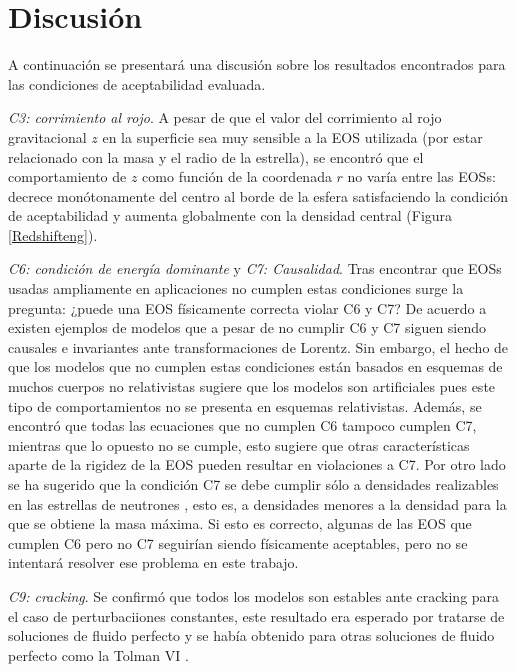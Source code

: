\section{Discusión}

\noindent A continuación se presentará una discusión sobre los resultados encontrados para las condiciones de aceptabilidad evaluada.

\emph{C3: corrimiento al rojo}. A pesar de que el valor del corrimiento al rojo gravitacional $z$ en la superficie sea muy sensible a la EOS utilizada (por estar relacionado con la masa y el radio de la estrella), se encontró que el comportamiento de $z$ como función de la coordenada $r$ no varía entre las EOSs: decrece monótonamente del centro al borde de la esfera satisfaciendo la condición de aceptabilidad y aumenta globalmente con la densidad central (Figura \ref{Redshifteng}).

\emph{C6: condición de energía dominante} y \emph{C7: Causalidad}. Tras encontrar que EOSs usadas ampliamente en aplicaciones no cumplen estas condiciones surge la pregunta: ¿puede una EOS físicamente correcta violar C6 y C7? De acuerdo a \cite{Haensel2007} existen ejemplos de modelos que a pesar de no cumplir C6 y C7 siguen siendo causales e invariantes ante transformaciones de Lorentz. Sin embargo, el hecho de que los modelos que no cumplen estas condiciones están basados en esquemas de muchos cuerpos no relativistas sugiere que los modelos son artificiales pues este tipo de comportamientos no se presenta en esquemas relativistas. Además, se encontró que todas las ecuaciones que no cumplen C6 tampoco cumplen C7, mientras que lo opuesto no se cumple, esto sugiere que otras características aparte de la rigidez de la EOS pueden resultar en violaciones a C7. Por otro lado se ha sugerido que la condición C7 se debe cumplir sólo a densidades realizables en las estrellas de neutrones \cite{Douchin2001}, esto es, a densidades menores a la densidad para la que se obtiene la masa máxima. Si esto es correcto, algunas de las EOS que cumplen C6 pero no C7 seguirían siendo físicamente aceptables, pero no se intentará resolver ese problema en este trabajo.

\emph{C9: cracking}. Se confirmó que todos los modelos son estables ante cracking para el caso de perturbaciiones constantes, este resultado era esperado por tratarse de soluciones de fluido perfecto y se había obtenido para otras soluciones de fluido perfecto como la Tolman VI \cite{Herrera1992}.

